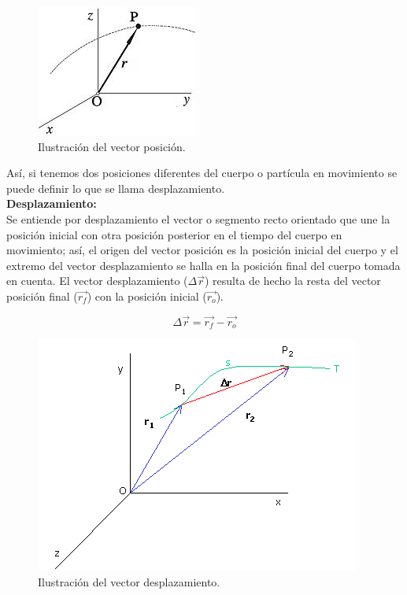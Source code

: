 \documentclass[a5paper,pagesize,10pt,bibtotoc,pointlessnumbers,
normalheadings,DIV=9,fleqn,x11names,table,twoside=false]{scrbook}
\begin{document}
\begin{figure}[ht]
 \centering
 \includegraphics[scale=0.6]{images/posicion.jpg}
 \caption{Ilustración del vector posición.}
\end{figure}

Así, si tenemos dos posiciones diferentes del cuerpo o partícula en movimiento se puede definir lo que se llama desplazamiento.\\

\textbf{Desplazamiento:}\\

Se entiende por desplazamiento el vector o segmento recto orientado que une la posición inicial con otra posición posterior en el 
tiempo del cuerpo en movimiento; así, el origen del vector posición es la posición inicial del cuerpo y el extremo del vector 
desplazamiento se halla en la posición final del cuerpo tomada en cuenta. El vector desplazamiento ($\Delta \vec{r}$) resulta de 
hecho la resta del vector posición final ($\vec{r_f}$) con la posición inicial ($\vec{r_o}$).

\begin{equation}
 \Delta \vec{r} = \vec{r_f}-\vec{r_o}
\end{equation}

\begin{figure}[ht]
 \centering
 \includegraphics[scale=0.5]{images/cinematica.png}
 \caption{Ilustración del vector desplazamiento.}
\end{figure}
\end{document}
